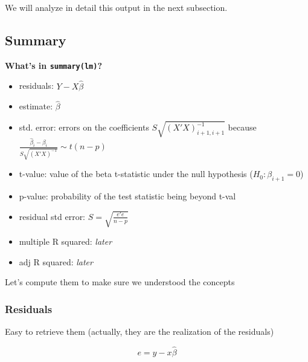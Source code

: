 \documentclass[
  oneside]{book}
\newenvironment{Shaded}{\begin{snugshade}}{\end{snugshade}}
\newcommand{\AttributeTok}[1]{\textcolor[rgb]{0.77,0.63,0.00}{#1}}
\newcommand{\DecValTok}[1]{\textcolor[rgb]{0.00,0.00,0.81}{#1}}
\newcommand{\FunctionTok}[1]{\textcolor[rgb]{0.00,0.00,0.00}{#1}}
\newcommand{\NormalTok}[1]{#1}
\newcommand{\OtherTok}[1]{\textcolor[rgb]{0.56,0.35,0.01}{#1}}
\newcommand{\SpecialCharTok}[1]{\textcolor[rgb]{0.00,0.00,0.00}{#1}}
\begin{document}
We will analyze in detail this output in the next subsection.

\hypertarget{summary}{%
\subsection{Summary}\label{summary}}

\textbf{What's in \texttt{summary(lm)}?}

\begin{itemize}
\item
  residuals: \(Y - X\hat\beta\)
\item
  estimate: \(\hat\beta\)
\item
  std. error: errors on the coefficients \(S \sqrt{(X'X)^{-1}_{i+1,i+1}}\)
  because \(\frac{\hat\beta_i - \beta_i}{S\sqrt{(X'X)^{-1}}}\sim t(n-p)\)
\item
  t-value: value of the beta t-statistic
  under the null hypothesis (\(H_0: \beta_{i+1} = 0\))
\item
  p-value: probability of the test statistic being beyond t-val
\item
  residual std error: \(S = \sqrt{\frac{e'e}{n-p}}\)
\item
  multiple R squared: \emph{later}
\item
  adj R squared: \emph{later}
\end{itemize}

Let's compute them to make sure we understood the concepts

\hypertarget{residuals}{%
\subsubsection{Residuals}\label{residuals}}

Easy to retrieve them (actually,
they are the realization of the residuals)

\[
e = y - x\hat\beta
\]

\begin{Shaded}
\end{Shaded}
\end{document}
